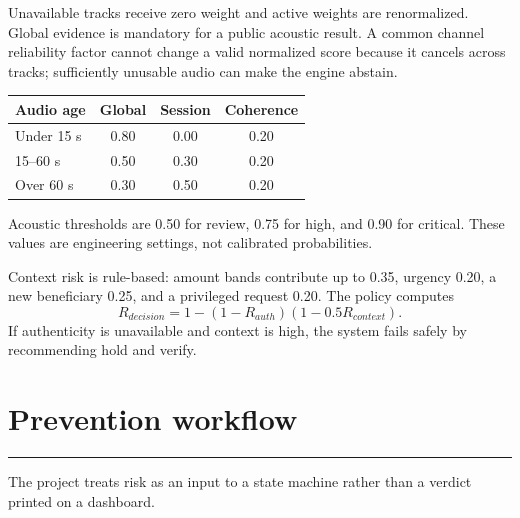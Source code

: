 \documentclass[10pt,a4paper]{article}
\newcommand{\sectionrule}{\vspace{-2mm}\textcolor{blue}{\rule{22mm}{1.2pt}}\vspace{2mm}}
\begin{document}
Unavailable tracks receive zero weight and active weights are renormalized. Global evidence is mandatory for a public acoustic result. A common channel reliability factor cannot change a valid normalized score because it cancels across tracks; sufficiently unusable audio can make the engine abstain.

\begin{tabular}{@{}lccc@{}}
\toprule
\textbf{Audio age} & \textbf{Global} & \textbf{Session} & \textbf{Coherence}\\
\midrule
Under 15 s & 0.80 & 0.00 & 0.20\\
15--60 s & 0.50 & 0.30 & 0.20\\
Over 60 s & 0.30 & 0.50 & 0.20\\
\bottomrule
\end{tabular}

Acoustic thresholds are 0.50 for review, 0.75 for high, and 0.90 for critical. These values are engineering settings, not calibrated probabilities.

Context risk is rule-based: amount bands contribute up to 0.35, urgency 0.20, a new beneficiary 0.25, and a privileged request 0.20. The policy computes
\[
R_{decision}=1-(1-R_{auth})(1-0.5R_{context}).
\]
If authenticity is unavailable and context is high, the system fails safely by recommending hold and verify.

\section{Prevention workflow}
\sectionrule

The project treats risk as an input to a state machine rather than a verdict printed on a dashboard.

\begin{center}
\end{center}
\end{document}
